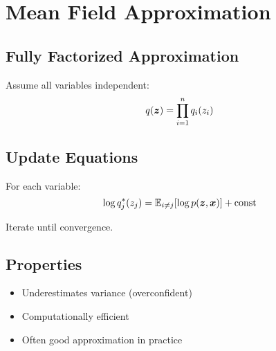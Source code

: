 
\section{Mean Field Approximation}
\label{sec:mean-field}

\subsection{Fully Factorized Approximation}

Assume all variables independent:
\begin{equation}
q(\boldsymbol{z}) = \prod_{i=1}^{n} q_i(z_i)
\end{equation}

\subsection{Update Equations}

For each variable:
\begin{equation}
\log q_j^*(z_j) = \mathbb{E}_{i \neq j}[\log p(\boldsymbol{z}, \boldsymbol{x})] + \text{const}
\end{equation}

Iterate until convergence.

\subsection{Properties}

\begin{itemize}
    \item Underestimates variance (overconfident)
    \item Computationally efficient
    \item Often good approximation in practice
\end{itemize}

